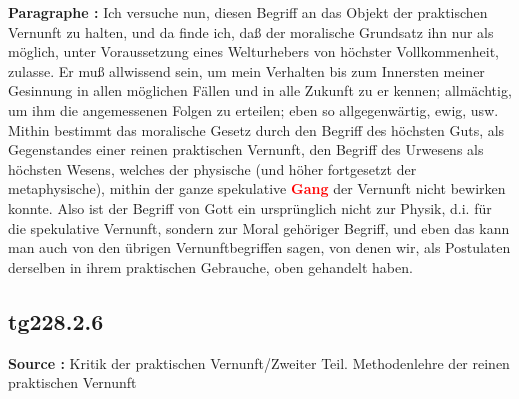 \documentclass[a4paper,12pt,twoside]{book}
\newcommand{\match}[1]{\textcolor{red}{\textbf{#1}}}
\begin{document}
	\textbf{Paragraphe : }Ich versuche nun, diesen Begriff an das Objekt der praktischen Vernunft zu halten, und da finde ich, daß der moralische Grundsatz ihn nur als möglich, unter Voraussetzung eines Welturhebers von höchster Vollkommenheit, zulasse. Er muß allwissend sein, um mein Verhalten bis zum Innersten meiner Gesinnung in allen möglichen Fällen und in alle Zukunft zu er kennen; allmächtig, um ihm die angemessenen Folgen zu erteilen; eben so allgegenwärtig, ewig, usw. Mithin bestimmt das moralische Gesetz durch den Begriff des höchsten Guts, als Gegenstandes einer reinen praktischen Vernunft, den Begriff des Urwesens als höchsten Wesens, welches der physische (und höher fortgesetzt der metaphysische), mithin der ganze spekulative  \match{Gang} der Vernunft nicht bewirken konnte. Also ist der Begriff von Gott ein ursprünglich nicht zur Physik, d.i. für die spekulative Vernunft, sondern zur Moral gehöriger Begriff, und eben das kann man auch von den übrigen Vernunftbegriffen sagen, von denen wir, als Postulaten derselben in ihrem praktischen Gebrauche, oben gehandelt haben. 
	
	\subsection*{tg228.2.6} 
	\textbf{Source : }Kritik der praktischen Vernunft/Zweiter Teil. Methodenlehre der reinen praktischen Vernunft\\  
	
\end{document}
